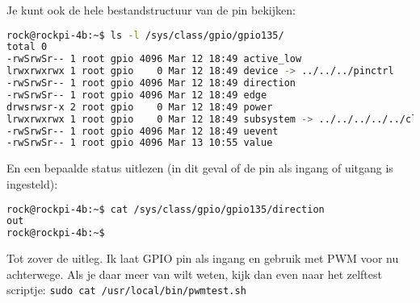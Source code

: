 Je kunt ook de hele bestandstructuur van de pin bekijken:
\begin{lstlisting}[language=bash]
rock@rockpi-4b:~$ ls -l /sys/class/gpio/gpio135/
total 0
-rwSrwSr-- 1 root gpio 4096 Mar 12 18:49 active_low
lrwxrwxrwx 1 root gpio    0 Mar 12 18:49 device -> ../../../pinctrl
-rwSrwSr-- 1 root gpio 4096 Mar 12 18:49 direction
-rwSrwSr-- 1 root gpio 4096 Mar 12 18:49 edge
drwsrwsr-x 2 root gpio    0 Mar 12 18:49 power
lrwxrwxrwx 1 root gpio    0 Mar 12 18:49 subsystem -> ../../../../../class/gpio
-rwSrwSr-- 1 root gpio 4096 Mar 12 18:49 uevent
-rwSrwSr-- 1 root gpio 4096 Mar 13 10:55 value
\end{lstlisting}
	
En een bepaalde status uitlezen (in dit geval of de pin als ingang of uitgang is ingesteld):
\begin{lstlisting}[language=bash]
rock@rockpi-4b:~$ cat /sys/class/gpio/gpio135/direction
out
rock@rockpi-4b:~$
\end{lstlisting}
	
Tot zover de uitleg. Ik laat GPIO pin als ingang en gebruik met PWM voor nu achterwege. Als je daar meer van wilt weten, kijk dan even naar het zelftest scriptje: \texttt{sudo cat /usr/local/bin/pwmtest.sh} 

